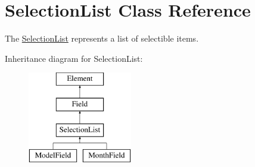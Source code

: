 \hypertarget{class_selection_list}{
\section{SelectionList Class Reference}
\label{class_selection_list}
}


The \hyperlink{class_selection_list}{SelectionList} represents a list of selectible items.  


Inheritance diagram for SelectionList:\begin{figure}[H]
\begin{center}
\leavevmode
\includegraphics[height=4.000000cm]{class_selection_list}
\end{center}
\end{figure}
